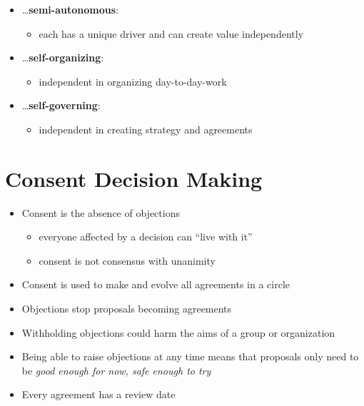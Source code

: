\begin{itemize}
\item {\ldots}\textbf{semi-autonomous}:

\begin{itemize}
\item each has a unique driver and can create value independently

\end{itemize}

\item {\ldots}\textbf{self-organizing}:

\begin{itemize}
\item independent in organizing day-to-day-work

\end{itemize}

\item {\ldots}\textbf{self-governing}:

\begin{itemize}
\item independent in creating strategy and agreements

\end{itemize}

\end{itemize}

\section{Consent Decision Making}
\label{consentdecisionmaking}

\begin{itemize}
\item Consent is the absence of objections

\begin{itemize}
\item everyone affected by a decision can ``live with it''

\item consent is not consensus with unanimity

\end{itemize}

\item Consent is used to make and evolve all agreements in a circle

\item Objections stop proposals becoming agreements

\item Withholding objections could harm the aims of a group or organization

\item Being able to raise objections at any time means that proposals only need to be \emph{good enough for now, safe enough to try}

\item Every agreement has a review date

\end{itemize}


